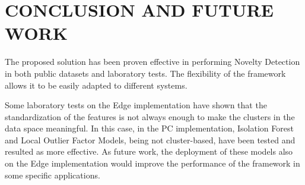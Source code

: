 \section{CONCLUSION AND FUTURE WORK}

The proposed solution has been proven effective in performing Novelty Detection in both public datasets and laboratory tests. The flexibility of the framework allows it to be easily adapted to different systems. 

Some laboratory tests on the Edge implementation have shown that the standardization of the features is not always enough to make the clusters in the data space meaningful. In this case, in the PC implementation, Isolation Forest and Local Outlier Factor Models, being not cluster-based, have been tested and resulted as more effective. As future work, the deployment of these models also on the Edge implementation would improve the performance of the framework in some specific applications.
